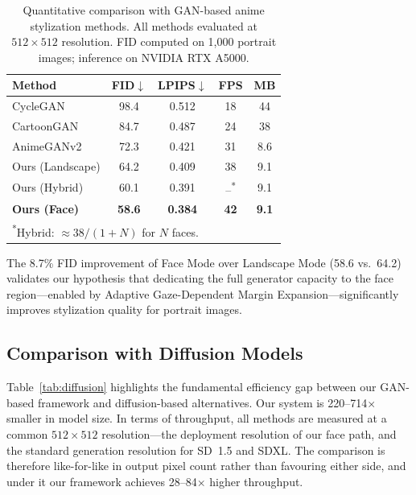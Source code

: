\documentclass[journal]{IEEEtran}
\begin{document}
\begin{table}[t]
\caption{Quantitative comparison with GAN-based anime stylization methods. All methods evaluated at $512 \times 512$ resolution. FID computed on 1,000 portrait images; inference on NVIDIA RTX A5000.}
\label{tab:quantitative}
\centering
\footnotesize
\setlength{\tabcolsep}{4pt}
\begin{tabular}{lcccc}
\toprule
\textbf{Method} & \textbf{FID}$\downarrow$ & \textbf{LPIPS}$\downarrow$ & \textbf{FPS} & \textbf{MB} \\
\midrule
CycleGAN~\cite{Zhu2017} & 98.4 & 0.512 & 18 & 44 \\
CartoonGAN~\cite{Chen2018CartoonGAN} & 84.7 & 0.487 & 24 & 38 \\
AnimeGANv2~\cite{ChenLiu2020} & 72.3 & 0.421 & 31 & 8.6 \\
\midrule
Ours (Landscape) & 64.2 & 0.409 & 38 & 9.1 \\
Ours (Hybrid) & 60.1 & 0.391 & --\textsuperscript{*} & 9.1 \\
\textbf{Ours (Face)} & \textbf{58.6} & \textbf{0.384} & \textbf{42} & \textbf{9.1} \\
\bottomrule
\multicolumn{5}{l}{\textsuperscript{*}Hybrid: $\approx 38/(1{+}N)$ for $N$ faces.}
\end{tabular}
\end{table}

The 8.7\% FID improvement of Face Mode over Landscape Mode (58.6 vs.\ 64.2) validates our hypothesis that dedicating the full generator capacity to the face region---enabled by Adaptive Gaze-Dependent Margin Expansion---significantly improves stylization quality for portrait images.

\subsection{Comparison with Diffusion Models}

Table~\ref{tab:diffusion} highlights the fundamental efficiency gap between our GAN-based framework and diffusion-based alternatives. Our system is 220--714$\times$ smaller in model size. In terms of throughput, all methods are measured at a common $512 \times 512$ resolution---the deployment resolution of our face path, and the standard generation resolution for SD~1.5 and SDXL. The comparison is therefore like-for-like in output pixel count rather than favouring either side, and under it our framework achieves 28--84$\times$ higher throughput.
\end{document}
